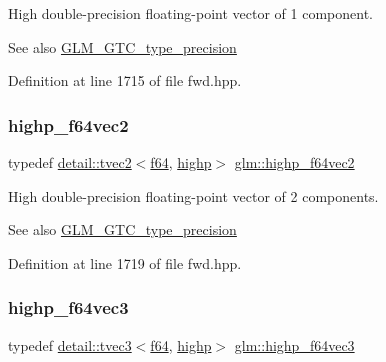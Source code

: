 High double-\/precision floating-\/point vector of 1 component. \begin{DoxySeeAlso}{See also}
\hyperlink{group__gtc__type__precision}{G\+L\+M\+\_\+\+G\+T\+C\+\_\+type\+\_\+precision} 
\end{DoxySeeAlso}


Definition at line 1715 of file fwd.\+hpp.

\mbox{\label{group__gtc__type__precision_ga1efd4982eaeafae59ce40deb89e018e7}} 
\subsubsection{\texorpdfstring{highp\+\_\+f64vec2}{highp\_f64vec2}}
{\footnotesize\ttfamily typedef \hyperlink{structglm_1_1detail_1_1tvec2}{detail\+::tvec2}$<$\hyperlink{group__gtc__type__precision_ga2bba392e555124b36cde6abba349bab3}{f64}, \hyperlink{namespaceglm_a0f04f086094c747d227af4425893f545ac6f7eab42eacbb10d59a58e95e362074}{highp}$>$ \hyperlink{group__gtc__type__precision_ga1efd4982eaeafae59ce40deb89e018e7}{glm\+::highp\+\_\+f64vec2}}

High double-\/precision floating-\/point vector of 2 components. \begin{DoxySeeAlso}{See also}
\hyperlink{group__gtc__type__precision}{G\+L\+M\+\_\+\+G\+T\+C\+\_\+type\+\_\+precision} 
\end{DoxySeeAlso}


Definition at line 1719 of file fwd.\+hpp.

\mbox{\label{group__gtc__type__precision_ga93cbac95bb9106fe15c987c0f56ae679}} 
\subsubsection{\texorpdfstring{highp\+\_\+f64vec3}{highp\_f64vec3}}
{\footnotesize\ttfamily typedef \hyperlink{structglm_1_1detail_1_1tvec3}{detail\+::tvec3}$<$\hyperlink{group__gtc__type__precision_ga2bba392e555124b36cde6abba349bab3}{f64}, \hyperlink{namespaceglm_a0f04f086094c747d227af4425893f545ac6f7eab42eacbb10d59a58e95e362074}{highp}$>$ \hyperlink{group__gtc__type__precision_ga93cbac95bb9106fe15c987c0f56ae679}{glm\+::highp\+\_\+f64vec3}}

